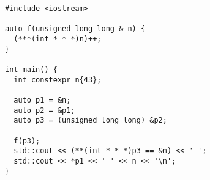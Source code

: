 \begin{frame}[fragile]
  \begin{lstlisting}[language={[11]C++}]
#include <iostream>

auto f(unsigned long long & n) {
  (***(int * * *)n)++;
}

int main() {
  int constexpr n{43};

  auto p1 = &n;
  auto p2 = &p1;
  auto p3 = (unsigned long long) &p2;

  f(p3);
  std::cout << (**(int * * *)p3 == &n) << ' ';
  std::cout << *p1 << ' ' << n << '\n';
}
  \end{lstlisting}
\end{frame}
